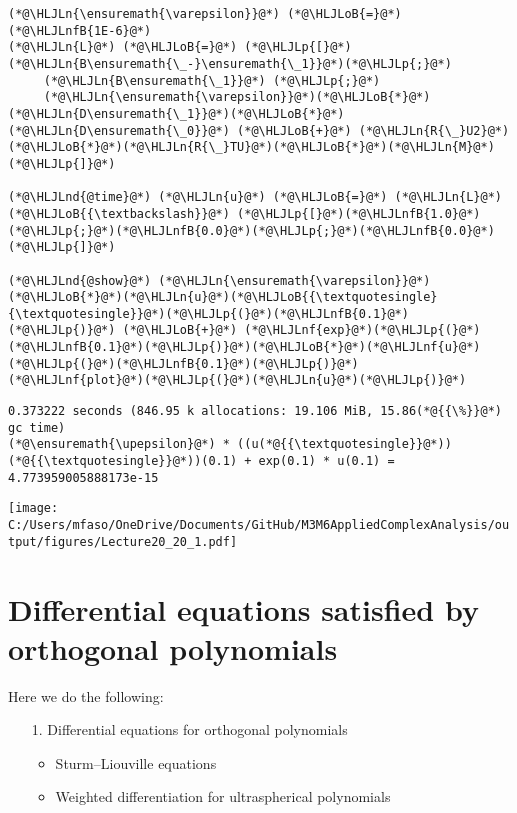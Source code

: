 \documentclass[12pt,landscape]{article}
\newcommand{\HLJLn}[1]{#1}
\newcommand{\HLJLnd}[1]{\textcolor[RGB]{214,102,97}{#1}}
\newcommand{\HLJLnf}[1]{\textcolor[RGB]{66,102,213}{#1}}
\newcommand{\HLJLnfB}[1]{\textcolor[RGB]{59,151,46}{#1}}
\newcommand{\HLJLoB}[1]{\textcolor[RGB]{102,102,102}{\textbf{#1}}}
\newcommand{\HLJLp}[1]{#1}
\def\upepsilon{\varepsilon}
\def\endash{–}
\def\cent#1{\begin{center}#1\end{center} }
\begin{document}
{\begin{lstlisting}
(*@\HLJLn{\ensuremath{\varepsilon}}@*) (*@\HLJLoB{=}@*) (*@\HLJLnfB{1E-6}@*)
(*@\HLJLn{L}@*) (*@\HLJLoB{=}@*) (*@\HLJLp{[}@*)(*@\HLJLn{B\ensuremath{\_-}\ensuremath{\_1}}@*)(*@\HLJLp{;}@*)
     (*@\HLJLn{B\ensuremath{\_1}}@*) (*@\HLJLp{;}@*)
     (*@\HLJLn{\ensuremath{\varepsilon}}@*)(*@\HLJLoB{*}@*)(*@\HLJLn{D\ensuremath{\_1}}@*)(*@\HLJLoB{*}@*)(*@\HLJLn{D\ensuremath{\_0}}@*) (*@\HLJLoB{+}@*) (*@\HLJLn{R{\_}U2}@*)(*@\HLJLoB{*}@*)(*@\HLJLn{R{\_}TU}@*)(*@\HLJLoB{*}@*)(*@\HLJLn{M}@*)(*@\HLJLp{]}@*)

(*@\HLJLnd{@time}@*) (*@\HLJLn{u}@*) (*@\HLJLoB{=}@*) (*@\HLJLn{L}@*) (*@\HLJLoB{{\textbackslash}}@*) (*@\HLJLp{[}@*)(*@\HLJLnfB{1.0}@*)(*@\HLJLp{;}@*)(*@\HLJLnfB{0.0}@*)(*@\HLJLp{;}@*)(*@\HLJLnfB{0.0}@*)(*@\HLJLp{]}@*)

(*@\HLJLnd{@show}@*) (*@\HLJLn{\ensuremath{\varepsilon}}@*)(*@\HLJLoB{*}@*)(*@\HLJLn{u}@*)(*@\HLJLoB{{\textquotesingle}{\textquotesingle}}@*)(*@\HLJLp{(}@*)(*@\HLJLnfB{0.1}@*)(*@\HLJLp{)}@*) (*@\HLJLoB{+}@*) (*@\HLJLnf{exp}@*)(*@\HLJLp{(}@*)(*@\HLJLnfB{0.1}@*)(*@\HLJLp{)}@*)(*@\HLJLoB{*}@*)(*@\HLJLnf{u}@*)(*@\HLJLp{(}@*)(*@\HLJLnfB{0.1}@*)(*@\HLJLp{)}@*)
(*@\HLJLnf{plot}@*)(*@\HLJLp{(}@*)(*@\HLJLn{u}@*)(*@\HLJLp{)}@*)
\end{lstlisting}

\begin{lstlisting}
0.373222 seconds (846.95 k allocations: 19.106 MiB, 15.86(*@{{\%}}@*) gc time)
(*@\ensuremath{\upepsilon}@*) * ((u(*@{{\textquotesingle}}@*))(*@{{\textquotesingle}}@*))(0.1) + exp(0.1) * u(0.1) = 4.773959005888173e-15
\end{lstlisting}

\cent{\texttt{[image: C:/Users/mfaso/OneDrive/Documents/GitHub/M3M6AppliedComplexAnalysis/output/figures/Lecture20\_20\_1.pdf]}}

\section{Differential equations satisfied by orthogonal polynomials}
Here we do the following:

\begin{itemize}
\item[1. ] Differential equations for orthogonal polynomials

\begin{itemize}
\item Sturm\ensuremath{\endash}Liouville equations


\item Weighted differentiation for ultraspherical polynomials



\end{itemize}
\end{itemize}}
\end{document}
